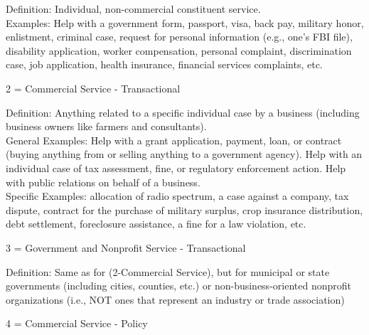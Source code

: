 \documentclass[12pt]{article}
\begin{document}
\hfill\begin{minipage}{\dimexpr\textwidth-2cm}
Definition: Individual, non-commercial constituent service.\\
Examples: Help with a government form, passport, visa, back pay, military honor, enlistment, criminal case, request for personal information (e.g., one’s FBI file), disability application, worker compensation, personal complaint, discrimination case, job application, health insurance, financial services complaints, etc.\\
\end{minipage}

2 = Commercial Service - Transactional \\

\hfill\begin{minipage}{\dimexpr\textwidth-2cm}
Definition: Anything related to a specific individual case by a business (including business owners like farmers and consultants).\\ 
General Examples: Help with a grant application, payment, loan, or contract (buying anything from or selling anything to a government agency). Help with an individual case of tax assessment, fine, or regulatory enforcement action. Help with public relations on behalf of a business.\\
Specific Examples: allocation of radio spectrum, a case against a company, tax dispute, contract for the purchase of military surplus, crop insurance distribution, debt settlement, foreclosure assistance, a fine for a law violation, etc. \\
\end{minipage}

3 = Government and Nonprofit Service - Transactional\\

\hfill\begin{minipage}{\dimexpr\textwidth-2cm}
Definition: Same as for (2-Commercial Service), but for municipal or state governments (including cities, counties, etc.) or non-business-oriented nonprofit organizations (i.e., NOT ones that represent an industry or trade association) \\
\end{minipage}

4 = Commercial Service - Policy \\
\end{document}
